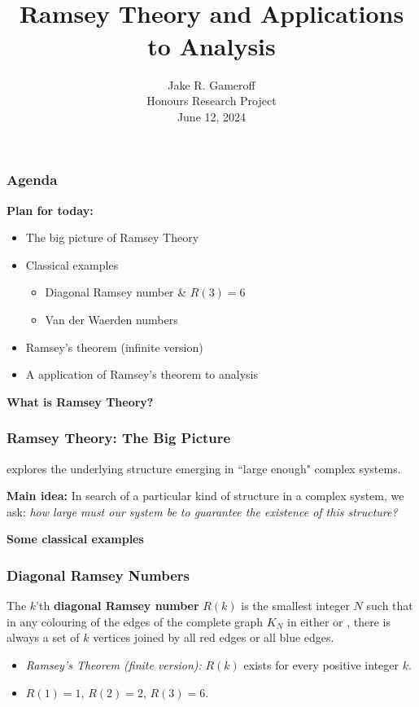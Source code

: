 \documentclass{beamer}
\title{\\ $ $ \\ $ $ \\ $ $ \\ $ $ \\ Ramsey Theory and Applications to Analysis}
\author{Jake R. Gameroff \\ Honours Research Project \\ June 12, 2024}
\date{}
\begin{document}
{
\frame{\titlepage}}

\begin{frame}
\frametitle{Agenda} \textbf{Plan for today:} 
\begin{itemize}
	\item The big picture of Ramsey Theory
	\item Classical examples
		\begin{itemize}
			\item Diagonal Ramsey number \& \( R(3)=6 \) 
			\item Van der Waerden numbers
		\end{itemize}
	\item Ramsey's theorem (infinite version)
	\item A {} application of Ramsey's theorem to analysis
\end{itemize}
\end{frame}

\begin{frame}
\begin{center}
	\Large{\textbf{What is Ramsey Theory?}}
\end{center}
\end{frame}

\begin{frame}
\frametitle{Ramsey Theory: The Big Picture}
{} explores the underlying structure emerging in ``large enough" complex systems.\newline

\textbf{Main idea:} In search of a particular kind of structure in a complex system, we ask: \emph{how large must our system be to guarantee the existence of this structure?}
\end{frame}

\begin{frame}
\begin{center}
	\Large{\textbf{Some classical examples}}
\end{center}
\end{frame}

\begin{frame}
\frametitle{Diagonal Ramsey Numbers} The \( k \)'th \textbf{diagonal Ramsey number} \( R(k) \) is the smallest integer \( N \) such that in any colouring of the edges of the complete graph \( K_{N}  \) in either {\color{red}{red}} or {\color{blue}{blue}}, there is always a set of \( k \) vertices joined by all red edges or all blue edges.
\begin{itemize}
	\item \emph{Ramsey's Theorem (finite version):} \( R(k) \) exists for every positive integer \( k \).
	\item \( R(1) = 1 \), \( R(2) = 2 \), \( R(3) = 6 \).
\end{itemize}
\end{frame}
\end{document}
